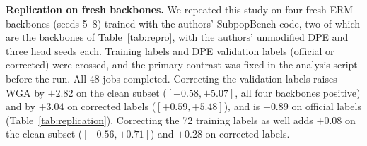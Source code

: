 \begin{table}[t]
\centering\small
\caption{Test WGA (\%) after fitting on official, corrected or reduced (drop) validation labels, on official labels and on the clean subset. Means over five head seeds (DPE) and over backbones. $\Delta$: paired difference to the official-label fit on the clean subset, 95\% interval over five standard-ERM backbones.}
\label{tab:labels}
\end{table}

\textbf{Replication on fresh backbones.} We repeated this study on four fresh ERM backbones (seeds 5--8) trained with the authors' SubpopBench code, two of which are the backbones of Table~\ref{tab:repro}, with the authors' unmodified DPE and three head seeds each. Training labels and DPE validation labels (official or corrected) were crossed, and the primary contrast was fixed in the analysis script before the run. All 48 jobs completed. Correcting the validation labels raises WGA by $+2.82$\pp{} on the clean subset ($[+0.58,+5.07]$, all four backbones positive) and by $+3.04$\pp{} on corrected labels ($[+0.59,+5.48]$), and is $-0.89$\pp{} on official labels (Table~\ref{tab:replication}). Correcting the 72 training labels as well adds $+0.08$\pp{} on the clean subset ($[-0.56,+0.71]$) and $+0.28$\pp{} on corrected labels.

